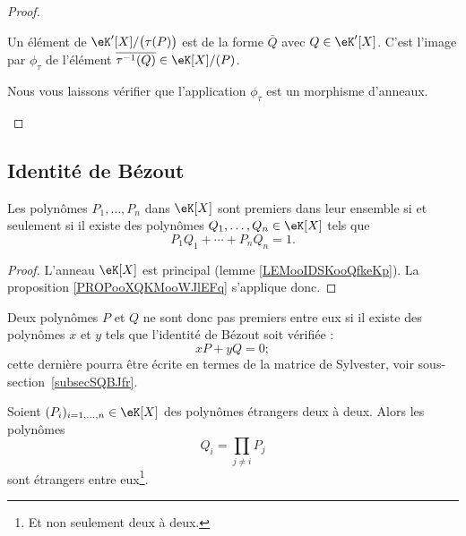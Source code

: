 \begin{proof}
\begin{subproof}
		\spitem[Surjection]

		Un élément de \( \eK'[X]/\big( \tau(P) \big)\) est de la forme \( \bar Q\) avec \( Q\in \eK'[X]\). C'est l'image par \( \phi_{\tau}\) de l'élément \( \overline{ \tau^{-1}(Q) }\in \eK[X]/(P)\).

		\spitem[Morphisme]

		Nous vous laissons vérifier que l'application \( \phi_{\tau}\) est un morphisme d'anneaux.

	\end{subproof}
\end{proof}

\subsection{Identité de Bézout}

\begin{theorem}[Bézout] \label{ThoBezoutOuGmLB}
	Les polynômes \( P_1,\ldots,P_n\) dans \( \eK[X]\) sont premiers dans leur ensemble si et seulement si il existe des polynômes \( Q_1,\ldots,Q_n\in\eK[X]\) tels que
	\begin{equation}
		P_1Q_1+\cdots+P_nQ_n=1.
	\end{equation}
\end{theorem}

\begin{proof}
	L'anneau \( \eK[X]\) est principal (lemme \ref{LEMooIDSKooQfkeKp}). La proposition \ref{PROPooXQKMooWJlEFq} s'applique donc.
\end{proof}

Deux polynômes \( P\) et \( Q\) ne sont donc pas premiers entre eux si il existe des polynômes \( x\) et \( y\) tels que l'identité de Bézout soit vérifiée :
\begin{equation}    \label{EqkbbzAi}
	xP+yQ=0;
\end{equation}
cette dernière pourra être écrite en termes de la matrice de Sylvester, voir sous-section~\ref{subsecSQBJfr}.

\begin{lemma}       \label{LemuALZHn}
	Soient \( (P_i)_{i=1,\ldots,n}\in \eK[X]\) des polynômes étrangers deux à deux. Alors les polynômes
	\begin{equation}
		Q_i=\prod_{j\neq i}P_j
	\end{equation}
	sont étrangers entre eux\footnote{Et non seulement deux à deux.}.
\end{lemma}

